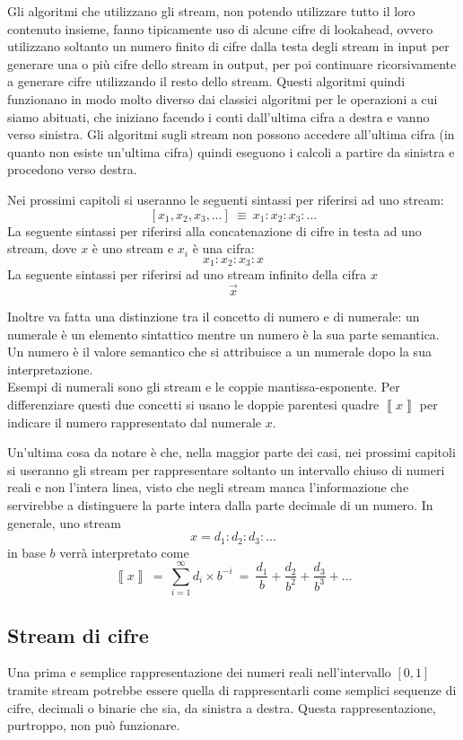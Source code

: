\documentclass[Lau]{sapthesis}
\begin{document}
Gli algoritmi che utilizzano gli stream, non potendo utilizzare tutto il loro 
contenuto insieme, fanno tipicamente uso di alcune cifre di lookahead, ovvero 
utilizzano soltanto un numero finito di cifre dalla testa degli stream in input 
per generare una o più cifre dello stream in output, per poi continuare 
ricorsivamente a generare cifre utilizzando il resto dello stream. Questi 
algoritmi quindi funzionano in modo molto diverso dai classici algoritmi per le 
operazioni a cui siamo abituati, che iniziano facendo i conti dall'ultima cifra 
a destra e vanno verso sinistra. Gli algoritmi sugli stream non possono accedere 
all'ultima cifra (in quanto non esiste un'ultima cifra) quindi eseguono i 
calcoli a partire da sinistra e procedono verso destra.

\medskip

Nei prossimi capitoli si useranno le seguenti sintassi per riferirsi ad uno 
stream:
$$\left[x_1, x_2, x_3,\ldots\right]\ \equiv\ x_1:x_2:x_3:\ldots$$
La seguente sintassi per riferirsi alla concatenazione di cifre in testa ad uno 
stream, dove $x$ è uno stream e $x_i$ è una cifra:
$$x_1:x_2:x_3:x$$
La seguente sintassi per riferirsi ad uno stream infinito della cifra $x$
$$\overrightarrow{x}$$

Inoltre va fatta una distinzione tra il concetto di numero e di numerale: un numerale è un elemento sintattico mentre un numero è la sua parte semantica. Un numero è il valore semantico che si attribuisce a un numerale dopo la sua interpretazione.\\
Esempi di numerali sono gli stream e le coppie mantissa-esponente. Per differenziare questi due concetti si usano le doppie parentesi quadre 
$\left\llbracket x\right\rrbracket$ per indicare il numero rappresentato dal 
numerale 
$x$.

Un'ultima cosa da notare è che, nella maggior parte dei casi, nei prossimi 
capitoli si useranno gli stream per rappresentare soltanto un intervallo chiuso 
di numeri reali e non l'intera linea, visto che negli stream manca 
l'informazione che servirebbe a distinguere la parte intera dalla parte decimale 
di un numero. In generale, uno stream
$$x=d_1:d_2:d_3:\ldots$$
in base $b$ verrà interpretato come
$$\left\llbracket x\right\rrbracket\ =\ \sum_{i=1}^{\infty} d_i \times b^{-i}\ =\ 
\frac{d_1}{b}+\frac{d_2}{b^2}+\frac{d_3}{b^3}+\ldots$$


\subsection{Stream di cifre}
Una prima e semplice rappresentazione dei numeri reali nell'intervallo $\left[0,1 \right]$ tramite stream potrebbe 
essere quella di rappresentarli come semplici sequenze di cifre, decimali o 
binarie che sia, da sinistra a destra. Questa rappresentazione, purtroppo, non 
può funzionare.
\end{document}

